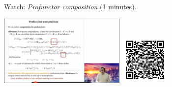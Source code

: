 
\begin{minipage}{10cm}
    \href{https://act4e-spring21.netlify.app/videos/spring2021-profunctors:prof-comp.html}{Watch: \emph{Profunctor composition} (1 minutes).}
        
    \href{https://act4e-spring21.netlify.app/videos/spring2021-profunctors:prof-comp.html}{\includegraphics[height=3.5cm]{spring2021-profunctors:prof-comp/thumbnails.jpg}}
    \href{https://act4e-spring21.netlify.app/videos/spring2021-profunctors:prof-comp.html}{\includegraphics[height=2.5cm]{spring2021-profunctors:prof-comp/qrcode.png}}
\end{minipage}
